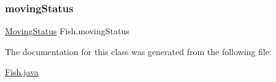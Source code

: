 \mbox{\label{class_fish_adb3e06c4c9cfd4e55a7d819c50702521}} 
\subsubsection{\texorpdfstring{moving\+Status}{movingStatus}}
{\footnotesize\ttfamily \mbox{\hyperlink{enum_moving_object_1_1_moving_status}{Moving\+Status}} Fish.\+moving\+Status\hspace{0.3cm}{\ttfamily [protected]}}



The documentation for this class was generated from the following file\+:\begin{DoxyCompactItemize}
\item 
\mbox{\hyperlink{_fish_8java}{Fish.\+java}}\end{DoxyCompactItemize}
